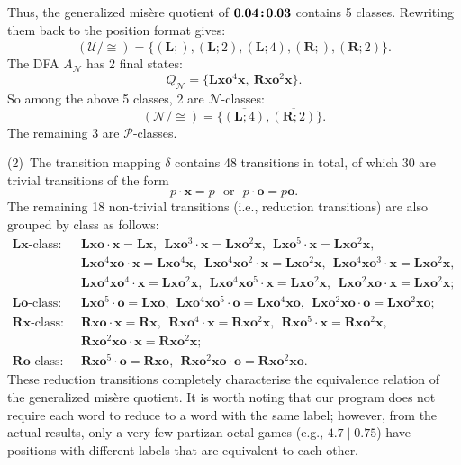 \documentclass[11pt]{article}
\theoremstyle{definition}
\theoremstyle{plain}
\newcommand{\varP}{\mathcal{P}}
\newcommand{\varN}{\mathcal{N}}
\newcommand{\rmL}{\mathbf{L}}
\newcommand{\rmR}{\mathbf{R}}
\newcommand{\x}{\mathbf{x}}
\newcommand{\e}{\mathbf{o}}
\newcommand{\varU}{\mathcal{U}}
\newcommand{\col}{\textbf{\;\!:\!\;}}
\begin{document}
Thus, the generalized misère quotient of $\mathbf{0.04\col0.03}$ contains 5 classes. Rewriting them back to the position format gives:
\[
    (\varU/\cong) = \{ \overline{(\rmL;)}, \overline{(\rmL; 2)} , \overline{(\rmL; 4)}, \overline{(\rmR;)}, \overline{(\rmR; 2)} \}.
\]
The DFA $A_{\varN}$ has 2 final states:
\[
    Q_{\varN} = \{\rmL\x\e^4\x,\ \rmR\x\e^2\x\}.
\]
So among the above 5 classes, 2 are $\varN$-classes:
\[
    (\varN/\cong) = \{ \overline{(\rmL; 4)}, \overline{(\rmR; 2)} \}.
\]
The remaining 3 are $\varP$-classes.

(2)~The transition mapping $\delta$ contains 48 transitions in total, of which 30 are trivial transitions of the form
\[
    p\cdot \x = p \text{~~or~~} p\cdot \e = p\e.
\]
The remaining 18 non-trivial transitions (i.e., reduction transitions) are also grouped by class as follows:
\small
\begin{align*}
    \text{$\rmL\x$-class:~~} & \rmL\x\e\cdot\x=\rmL\x,~~ \rmL\x\e^3\cdot\x=\rmL\x\e^2\x,~~ \rmL\x\e^5\cdot\x=\rmL\x\e^2\x,~~ \\
         & \rmL\x\e^4\x\e\cdot\x=\rmL\x\e^4\x,~~ \rmL\x\e^4\x\e^2\cdot\x=\rmL\x\e^2\x,~~ \rmL\x\e^4\x\e^3\cdot\x=\rmL\x\e^2\x, \\
         & \rmL\x\e^4\x\e^4\cdot\x=\rmL\x\e^2\x,~~ \rmL\x\e^4\x\e^5\cdot\x=\rmL\x\e^2\x,~~ \rmL\x\e^2\x\e\cdot\x=\rmL\x\e^2\x; \\
    \text{$\rmL\e$-class:~~} & \rmL\x\e^5\cdot\e=\rmL\x\e,~~ \rmL\x\e^4\x\e^5\cdot\e=\rmL\x\e^4\x\e,~~ \rmL\x\e^2\x\e\cdot\e=\rmL\x\e^2\x\e; \\
    \text{$\rmR\x$-class:~~} & \rmR\x\e\cdot\x=\rmR\x,~~ \rmR\x\e^4\cdot\x=\rmR\x\e^2\x,~~ \rmR\x\e^5\cdot\x=\rmR\x\e^2\x, \\
         & \rmR\x\e^2\x\e\cdot\x=\rmR\x\e^2\x; \\
    \text{$\rmR\e$-class:~~} & \rmR\x\e^5\cdot\e=\rmR\x\e,~~ \rmR\x\e^2\x\e\cdot\e=\rmR\x\e^2\x\e.
\end{align*}\normalsize
These reduction transitions completely characterise the equivalence relation of the generalized misère quotient.
It is worth noting that our program does not require each word to reduce to a word with the same label; however, from the actual results, only a very few partizan octal games (e.g., $\mathbf{4.7 \mid 0.75}$) have positions with different labels that are equivalent to each other.
\end{document}
